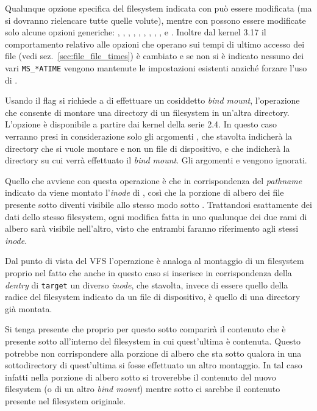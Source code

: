 Qualunque opzione specifica del filesystem indicata con  può
essere modificata (ma si dovranno rielencare tutte quelle volute), mentre con
 possono essere modificate solo alcune opzioni generiche:
, , ,
, , ,
, , ,
 e . Inoltre dal kernel 3.17 il
comportamento relativo alle opzioni che operano sui tempi di ultimo accesso
dei file (vedi sez.~\ref{sec:file_file_times}) è cambiato e se non si è
indicato nessuno dei vari \texttt{MS\_*ATIME} vengono mantenute le
impostazioni esistenti anziché forzare l'uso di .


Usando il flag  si richiede a  di effettuare un
cosiddetto \textit{bind mount}, l'operazione che consente di montare una
directory di un filesystem in un'altra directory. L'opzione è disponibile a
partire dai kernel della serie 2.4. In questo caso verranno presi in
considerazione solo gli argomenti , che stavolta indicherà la
directory che si vuole montare e non un file di dispositivo, e 
che indicherà la directory su cui verrà effettuato il \textit{bind mount}. Gli
argomenti  e  vengono ignorati.

Quello che avviene con questa operazione è che in corrispondenza del
\textit{pathname} indicato da  viene montato l'\textit{inode} di
, così che la porzione di albero dei file presente sotto
 diventi visibile allo stesso modo sotto
. Trattandosi esattamente dei dati dello stesso filesystem, ogni
modifica fatta in uno qualunque dei due rami di albero sarà visibile
nell'altro, visto che entrambi faranno riferimento agli stessi \textit{inode}.

Dal punto di vista del VFS l'operazione è analoga al montaggio di un
filesystem proprio nel fatto che anche in questo caso si inserisce in
corrispondenza della \textit{dentry} di \texttt{target} un diverso
\textit{inode}, che stavolta, invece di essere quello della radice del
filesystem indicato da un file di dispositivo, è quello di una directory già
montata.

Si tenga presente che proprio per questo sotto  comparirà il
contenuto che è presente sotto  all'interno del filesystem in
cui quest'ultima è contenuta. Questo potrebbe non corrispondere alla porzione
di albero che sta sotto  qualora in una sottodirectory di
quest'ultima si fosse effettuato un altro montaggio. In tal caso infatti nella
porzione di albero sotto  si troverebbe il contenuto del nuovo
filesystem (o di un altro \textit{bind mount}) mentre sotto  ci
sarebbe il contenuto presente nel filesystem originale.

